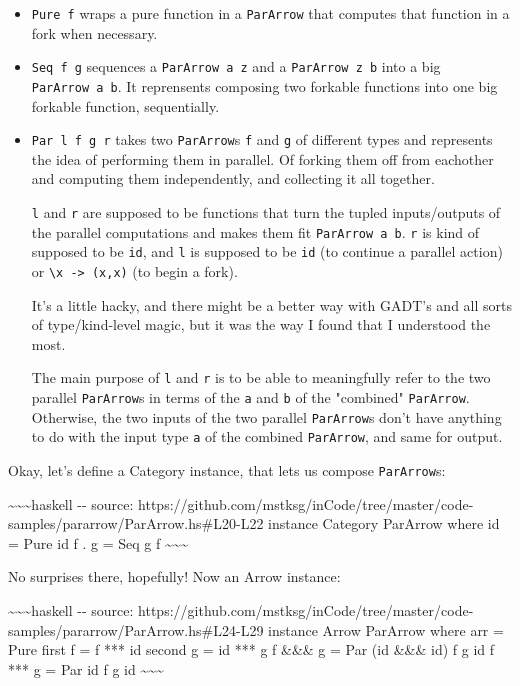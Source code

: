 \documentclass[]{article}
\begin{document}
\begin{itemize}
\item
  \texttt{Pure\ f} wraps a pure function in a \texttt{ParArrow} that computes
  that function in a fork when necessary.
\item
  \texttt{Seq\ f\ g} sequences a \texttt{ParArrow\ a\ z} and a
  \texttt{ParArrow\ z\ b} into a big \texttt{ParArrow\ a\ b}. It reprensents
  composing two forkable functions into one big forkable function, sequentially.
\item
  \texttt{Par\ l\ f\ g\ r} takes two \texttt{ParArrow}s \texttt{f} and
  \texttt{g} of different types and represents the idea of performing them in
  parallel. Of forking them off from eachother and computing them independently,
  and collecting it all together.

  \texttt{l} and \texttt{r} are supposed to be functions that turn the tupled
  inputs/outputs of the parallel computations and makes them fit
  \texttt{ParArrow\ a\ b}. \texttt{r} is kind of supposed to be \texttt{id}, and
  \texttt{l} is supposed to be \texttt{id} (to continue a parallel action) or
  \texttt{\textbackslash{}x\ -\textgreater{}\ (x,x)} (to begin a fork).

  It's a little hacky, and there might be a better way with GADT's and all sorts
  of type/kind-level magic, but it was the way I found that I understood the
  most.

  The main purpose of \texttt{l} and \texttt{r} is to be able to meaningfully
  refer to the two parallel \texttt{ParArrow}s in terms of the \texttt{a} and
  \texttt{b} of the "combined" \texttt{ParArrow}. Otherwise, the two inputs of
  the two parallel \texttt{ParArrow}s don't have anything to do with the input
  type \texttt{a} of the combined \texttt{ParArrow}, and same for output.
\end{itemize}

Okay, let's define a Category instance, that lets us compose \texttt{ParArrow}s:

\textasciitilde{}\textasciitilde{}\textasciitilde{}haskell -\/- source:
https://github.com/mstksg/inCode/tree/master/code-samples/pararrow/ParArrow.hs\#L20-L22
instance Category ParArrow where id = Pure id f . g = Seq g f
\textasciitilde{}\textasciitilde{}\textasciitilde{}

No surprises there, hopefully! Now an Arrow instance:

\textasciitilde{}\textasciitilde{}\textasciitilde{}haskell -\/- source:
https://github.com/mstksg/inCode/tree/master/code-samples/pararrow/ParArrow.hs\#L24-L29
instance Arrow ParArrow where arr = Pure first f = f *** id second g = id *** g
f \&\&\& g = Par (id \&\&\& id) f g id f *** g = Par id f g id
\textasciitilde{}\textasciitilde{}\textasciitilde{}
\end{document}
